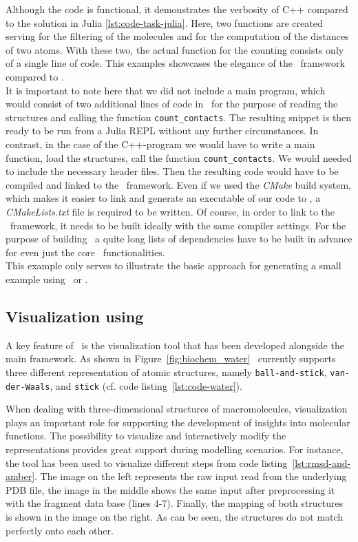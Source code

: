 Although the code is functional, it demonstrates the verbosity of C++ compared to the solution in Julia \ref{lst:code-task-julia}. Here, two functions are created serving for the filtering of the molecules and for the computation of the distances of two atoms. With these two, the actual function for the counting consists only of a single line of code. This examples showcases the elegance of the \biochem\ framework compared to \ball. \\

It is important to note here that we did not include a main program, which would consist of two additional lines of code in \biochem\ for the purpose of reading the structures and calling the function \texttt{count\_contacts}. The resulting snippet is then ready to be run from a Julia REPL without any further circumstances. In contrast, in the case of the C++-program we would have to write a main function, load the structures, call the function \texttt{count\_contacts}. We would needed to include the necessary header files. Then the resulting code would have to be compiled and linked to the \ball\ framework. Even if we used the \textit{CMake} build system, which makes it easier to link and generate an executable of our code to \ball, a \textit{CMakeLists.txt} file is required to be written.  Of course, in order to link to the \ball\ framework, it needs to be built ideally with the same compiler settings. For the purpose of building \ball\ a quite long lists of dependencies have to be built in advance for even just the core \ball\ functionalities. \\
This example only serves to illustrate the basic approach for generating a small example using \ball\ or \biochem.

\subsection{Visualization using \bioviz}

A key feature of \biochem\ is the visualization tool \textit{\bioviz} that
has been developed alongside the main framework. As shown in Figure~\ref{fig:biochem_water} \ \bioviz currently supports three different representation of atomic structures, namely \texttt{ball-and-stick}, \texttt{van-der-Waals}, and \texttt{stick} (cf. code listing~\ref{lst:code-water}).

When dealing with three-dimensional structures of macromolecules, visualization plays an important role for supporting the development of insights into molecular functions. The possibility to visualize and interactively modify the representations provides great support during modelling scenarios. For instance, the tool has been used to visualize different steps from code listing~\ref{lst:rmsd-and-amber}. The image on the left represents the raw input read from the underlying PDB file, the image in the middle shows the same input after preprocessing it with the fragment data base (lines 4-7). Finally, the mapping of both structures is shown in the image on the right. As can be seen, the structures do not match perfectly onto each other. 

